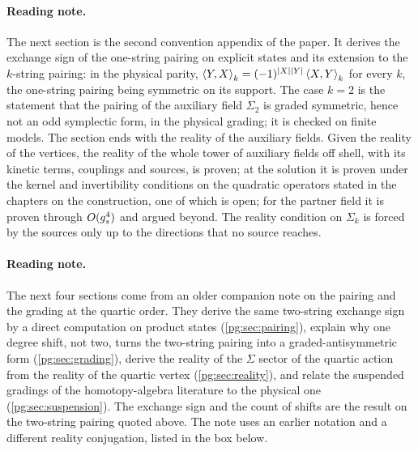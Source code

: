

\paragraph*{Reading note.}
 The next section is the second convention appendix of the paper.
It derives the exchange sign of the one-string pairing on explicit states and its extension to the $k$-string pairing: in the physical parity, $\pair[k]{Y}{X} = (-1)^{\abs{X} \abs{Y}} \pair[k]{X}{Y}$ for every $k$, the one-string pairing being symmetric on its support.
 The case $k = 2$ is the statement that the pairing of the auxiliary field $\Sigma_2$ is graded symmetric, hence not an odd symplectic form, in the physical grading; it is checked on finite models.
 The section ends with the reality of the auxiliary fields.
Given the reality of the vertices, the reality of the whole tower of auxiliary fields off shell, with its kinetic terms, couplings and sources, is proven; at the solution it is proven under the kernel and invertibility conditions on the quadratic operators stated in the chapters on the construction, one of which is open; for the partner field it is proven through $O(\gs^4)$ and argued beyond.
The reality condition on $\Sigma_k$ is forced by the sources only up to the directions that no source reaches.



\paragraph*{Reading note.}
The next four sections come from an older companion note on the pairing and the grading at the quartic order.
They derive the same two-string exchange sign by a direct computation on product states (\cref{pg:sec:pairing}), explain why one degree shift, not two, turns the two-string pairing into a graded-antisymmetric form (\cref{pg:sec:grading}), derive the reality of the $\Sigma$ sector of the quartic action from the reality of the quartic vertex (\cref{pg:sec:reality}), and relate the suspended gradings of the homotopy-algebra literature to the physical one (\cref{pg:sec:suspension}).
 The exchange sign and the count of shifts are the result on the two-string pairing quoted above.
The note uses an earlier notation and a different reality conjugation, listed in the box below.

